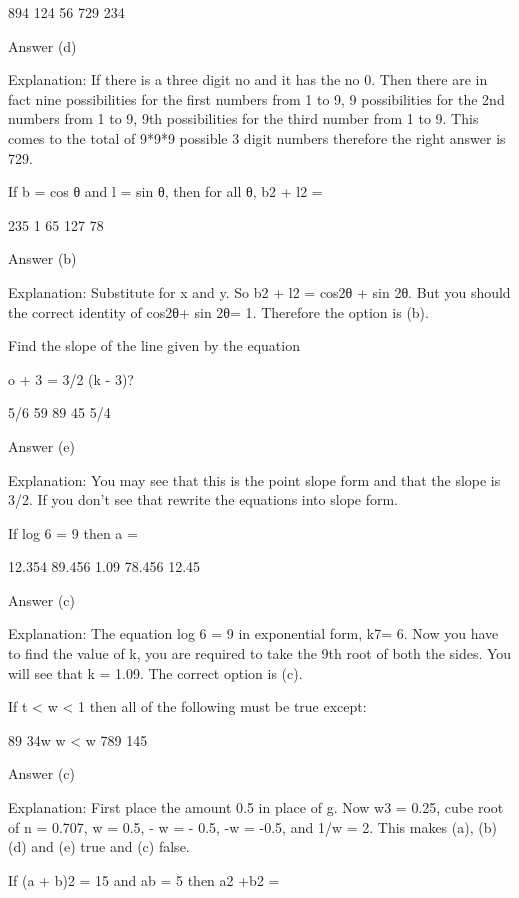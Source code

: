         894
        124
        56
        729
        234 

    Answer (d)

    Explanation: If there is a three digit no and it has the no 0. Then there are in fact nine possibilities for the first numbers from 1 to 9, 9 possibilities for the 2nd numbers from 1 to 9, 9th possibilities for the third number from 1 to 9. This comes to the total of 9*9*9 possible 3 digit numbers therefore the right answer is 729.

    If b = cos θ and l = sin θ, then for all θ, b2 + l2 =

        235
        1
        65
        127
        78 

    Answer (b)

    Explanation: Substitute for x and y. So b2 + l2 = cos2θ + sin 2θ. But you should the correct identity of cos2θ+ sin 2θ= 1. Therefore the option is (b).

    Find the slope of the line given by the equation

    o + 3 = 3/2 (k - 3)?

        5/6
        59
        89
        45
        5/4 

    Answer (e)

    Explanation: You may see that this is the point slope form and that the slope is 3/2. If you don't see that rewrite the equations into slope form.

    If log 6 = 9 then a =

        12.354
        89.456
        1.09
        78.456
        12.45 

    Answer (c)

    Explanation: The equation log 6 = 9 in exponential form, k7= 6. Now you have to find the value of k, you are required to take the 9th root of both the sides. You will see that k = 1.09. The correct option is (c).

    If t < w < 1 then all of the following must be true except:

        89
        34w
        w < w
        789
        145 

    Answer (c)

    Explanation: First place the amount 0.5 in place of g. Now w3 = 0.25, cube root of n = 0.707, w = 0.5, - w = - 0.5, -w = -0.5, and 1/w = 2. This makes (a), (b) (d) and (e) true and (c) false. 



    If (a + b)2 = 15 and ab = 5 then a2 +b2 =

